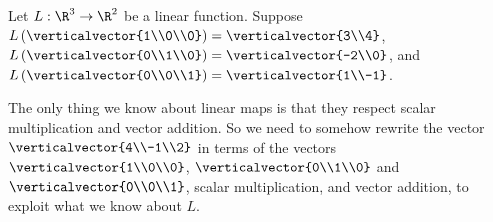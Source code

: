 \documentclass{ximera}
\begin{document}
\begin{question}
  Let $L:\R^3 \to \R^2$ be a linear function.  Suppose
  $L\left(\verticalvector{1\\0\\0}\right) = \verticalvector{3\\4}$,
  $L\left(\verticalvector{0\\1\\0}\right) = \verticalvector{-2\\0}$,
  and $L\left(\verticalvector{0\\0\\1}\right) =
  \verticalvector{1\\-1}$.
  
  \begin{solution}
  
  	\begin{hint}	
  		The only thing we know about linear maps is that they respect scalar multiplication and vector addition.  So we need to somehow rewrite the vector
  		$\verticalvector{4\\-1\\2}$ in terms of the vectors $\verticalvector{1\\0\\0}$, $\verticalvector{0\\1\\0}$ and $\verticalvector{0\\0\\1}$, scalar multiplication,
  		and vector addition, to exploit what we know about $L$.
  		
  		
  		

\end{hint}
\end{solution}
\end{question}
\end{document}
